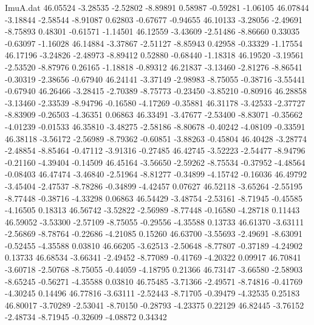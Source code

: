 \begin{filecontents}{ImuA.dat}
  46.05524   -3.28535   -2.52802   -8.89891    0.58987   -0.59281   -1.06105
  46.07844   -3.18844   -2.58544   -8.91087    0.62803   -0.67677   -0.94655
  46.10133   -3.28056   -2.49691   -8.75893    0.48301   -0.61571   -1.14501
  46.12559   -3.43609   -2.51486   -8.86660    0.33035   -0.63097   -1.16028
  46.14884   -3.37867   -2.51127   -8.85943    0.42958   -0.33329   -1.17554
  46.17196   -3.24826   -2.48973   -8.89412    0.52880   -0.68440   -1.18318
  46.19520   -3.19561   -2.53520   -8.87976    0.26165   -1.18818   -0.89312
  46.21837   -3.13460   -2.81276   -8.86541   -0.30319   -2.38656   -0.67940
  46.24141   -3.37149   -2.98983   -8.75055   -0.38716   -3.55441   -0.67940
  46.26466   -3.28415   -2.70389   -8.75773   -0.23450   -3.85210   -0.80916
  46.28858   -3.13460   -2.33539   -8.94796   -0.16580   -4.17269   -0.35881
  46.31178   -3.42533   -2.37727   -8.83909   -0.26503   -4.36351    0.06863
  46.33491   -3.47677   -2.53400   -8.83071   -0.35662   -4.01239   -0.01533
  46.35810   -3.48275   -2.58186   -8.80678   -0.40242   -4.08109   -0.33591
  46.38118   -3.56172   -2.56989   -8.79362   -0.60851   -3.88263   -0.45804
  46.40428   -3.28774   -2.48854   -8.85464   -0.47112   -3.91316   -0.27485
  46.42745   -3.52223   -2.54477   -8.94796   -0.21160   -4.39404   -0.14509
  46.45164   -3.56650   -2.59262   -8.75534   -0.37952   -4.48564   -0.08403
  46.47474   -3.46840   -2.51964   -8.81277   -0.34899   -4.15742   -0.16036
  46.49792   -3.45404   -2.47537   -8.78286   -0.34899   -4.42457    0.07627
  46.52118   -3.65264   -2.55195   -8.77448   -0.38716   -4.33298    0.06863
  46.54429   -3.48754   -2.53161   -8.71945   -0.45585   -4.16505    0.18313
  46.56742   -3.52822   -2.56989   -8.77448   -0.16580   -4.28718    0.11443
  46.59052   -3.53300   -2.57109   -8.75055   -0.29556   -4.35588    0.13733
  46.61370   -3.63111   -2.56869   -8.78764   -0.22686   -4.21085    0.15260
  46.63700   -3.55693   -2.49691   -8.63091   -0.52455   -4.35588    0.03810
  46.66205   -3.62513   -2.50648   -8.77807   -0.37189   -4.24902    0.13733
  46.68534   -3.66341   -2.49452   -8.77089   -0.41769   -4.20322    0.09917
  46.70841   -3.60718   -2.50768   -8.75055   -0.44059   -4.18795    0.21366
  46.73147   -3.66580   -2.58903   -8.65245   -0.56271   -4.35588    0.03810
  46.75485   -3.71366   -2.49571   -8.74816   -0.41769   -4.30245    0.14496
  46.77816   -3.63111   -2.52443   -8.71705   -0.39479   -4.32535    0.25183
  46.80017   -3.70289   -2.53041   -8.70150   -0.28793   -4.23375    0.22129
  46.82445   -3.76152   -2.48734   -8.71945   -0.32609   -4.08872    0.34342

\end{filecontents}
